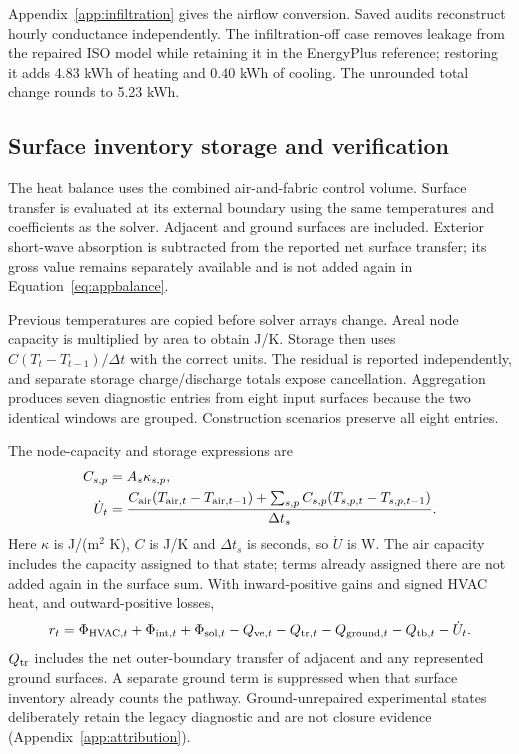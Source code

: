 Appendix~\ref{app:infiltration} gives the airflow conversion. Saved audits reconstruct hourly conductance independently. The infiltration-off case removes leakage from the repaired ISO model while retaining it in the EnergyPlus reference; restoring it adds 4.83 kWh of heating and 0.40 kWh of cooling. The unrounded total change rounds to 5.23 kWh.

\subsection{Surface inventory storage and verification}
\label{app:balance}
The heat balance uses the combined air-and-fabric control volume. Surface transfer is evaluated at its external boundary using the same temperatures and coefficients as the solver. Adjacent and ground surfaces are included. Exterior short-wave absorption is subtracted from the reported net surface transfer; its gross value remains separately available and is not added again in Equation~\ref{eq:appbalance}.

Previous temperatures are copied before solver arrays change. Areal node capacity is multiplied by area to obtain J/K. Storage then uses $C(T_t-T_{t-1})/\Delta t$ with the correct units. The residual is reported independently, and separate storage charge/discharge totals expose cancellation. Aggregation produces seven diagnostic entries from eight input surfaces because the two identical windows are grouped. Construction scenarios preserve all eight entries.

The node-capacity and storage expressions are
\begin{align}
C_{s,p}&=A_s\kappa_{s,p},\\
\dot U_t&=\frac{C_{\rm air}(T_{{\rm air},t}-T_{{\rm air},t-1})
+\sum_{s,p}C_{s,p}(T_{s,p,t}-T_{s,p,t-1})}{\Delta t_s}.
\end{align}
Here $\kappa$ is J/(m$^2$ K), $C$ is J/K and $\Delta t_s$ is seconds, so $\dot U$ is W. The air capacity includes the capacity assigned to that state; terms already assigned there are not added again in the surface sum. With inward-positive gains and signed HVAC heat, and outward-positive losses,
\begin{equation}\label{eq:appbalance}
r_t=\Phi_{{\rm HVAC},t}+\Phi_{{\rm int},t}+\Phi_{{\rm sol},t}
-Q_{{\rm ve},t}-Q_{{\rm tr},t}-Q_{{\rm ground},t}
-Q_{{\rm tb},t}-\dot U_t.
\end{equation}
$Q_{\rm tr}$ includes the net outer-boundary transfer of adjacent and any represented ground surfaces. A separate ground term is suppressed when that surface inventory already counts the pathway. Ground-unrepaired experimental states deliberately retain the legacy diagnostic and are not closure evidence (Appendix~\ref{app:attribution}).

